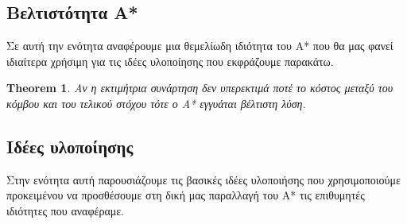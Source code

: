 \documentclass[a4paper,oneside, 11pt]{article}
\newtheorem{theorem}{Theorem}
\begin{document}
\subsection{Βελτιστότητα A*}
Σε αυτή την ενότητα αναφέρουμε μια θεμελίωδη ιδιότητα του A* που θα μας φανεί ιδιαίτερα χρήσιμη για τις ιδέες υλοποίησης που εκφράζουμε παρακάτω. \bigbreak 


\begin{theorem}
Αν η εκτιμήτρια συνάρτηση δεν υπερεκτιμά ποτέ το κόστος μεταξύ του κόμβου και του τελικού στόχου τότε ο A* εγγυάται βέλτιστη λύση.
\end{theorem}




\subsection{Ιδέες υλοποίησης}
Στην ενότητα αυτή παρουσιάζουμε τις βασικές ιδέες υλοποιήσης που χρησιμοποιούμε προκειμένου να προσθέσουμε στη δική μας παραλλαγή του A* τις επιθυμητές ιδιότητες που αναφέραμε. 
\end{document}
